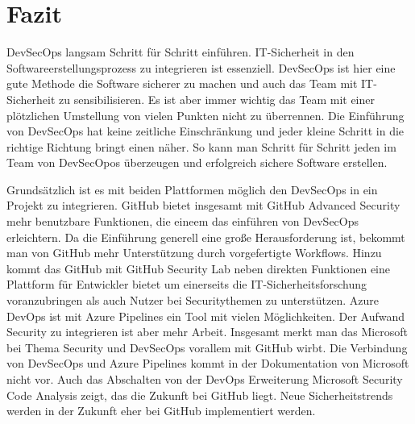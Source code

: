 \chapter{Fazit}
DevSecOps langsam Schritt für Schritt einführen.
IT-Sicherheit in den Softwareerstellungsprozess zu integrieren ist essenziell. DevSecOps ist hier eine gute Methode die Software sicherer zu machen und auch das Team mit IT-Sicherheit zu sensibilisieren. Es ist aber immer wichtig das Team mit einer plötzlichen Umstellung von vielen Punkten nicht zu überrennen. Die Einführung von DevSecOps hat keine zeitliche Einschränkung und jeder kleine Schritt in die richtige Richtung bringt einen näher. So kann man Schritt für Schritt jeden im Team von DevSecOpos überzeugen und erfolgreich sichere Software erstellen.

Grundsätzlich ist es mit beiden Plattformen möglich den DevSecOps in ein Projekt zu integrieren. GitHub bietet insgesamt mit GitHub Advanced Security mehr benutzbare Funktionen, die eineem das einführen von DevSecOps erleichtern. Da die Einführung generell eine große Herausforderung ist, bekommt man von GitHub mehr Unterstützung durch vorgefertigte Workflows. Hinzu kommt das GitHub mit GitHub Security Lab neben direkten Funktionen eine Plattform für Entwickler bietet um einerseits die IT-Sicherheitsforschung voranzubringen als auch Nutzer bei Securitythemen zu unterstützen.
Azure DevOps ist mit Azure Pipelines ein Tool mit vielen Möglichkeiten. Der Aufwand Security zu integrieren ist aber mehr Arbeit.
Insgesamt merkt man das Microsoft bei Thema Security und  DevSecOps vorallem mit GitHub wirbt. Die Verbindung von DevSecOps und Azure Pipelines kommt in der Dokumentation von Microsoft nicht vor. Auch das Abschalten von der DevOps Erweiterung Microsoft Security Code Analysis zeigt, das die Zukunft bei GitHub liegt. Neue Sicherheitstrends werden in der Zukunft eher bei GitHub implementiert werden.